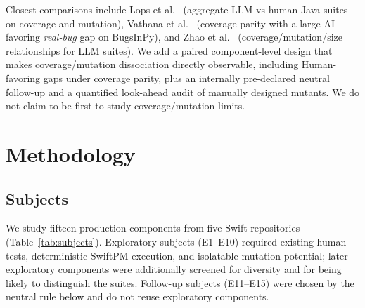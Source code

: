 \documentclass[10pt,conference]{IEEEtran}
\begin{document}
Closest comparisons include Lops et al.~\cite{lops2025agonetest} (aggregate LLM-vs-human Java suites on coverage and mutation), Vathana et al.~\cite{vathana2026} (coverage parity with a large AI-favoring \emph{real-bug} gap on BugsInPy), and Zhao et al.~\cite{zhao2026} (coverage/mutation/size relationships for LLM suites). We add a paired component-level design that makes coverage/mutation dissociation directly observable, including Human-favoring gaps under coverage parity, plus an internally pre-declared neutral follow-up and a quantified look-ahead audit of manually designed mutants. We do not claim to be first to study coverage/mutation limits.

\section{Methodology}

\subsection{Subjects}
We study fifteen production components from five Swift repositories (Table~\ref{tab:subjects}). Exploratory subjects (E1--E10) required existing human tests, deterministic SwiftPM execution, and isolatable mutation potential; later exploratory components were additionally screened for diversity and for being likely to distinguish the suites. Follow-up subjects (E11--E15) were chosen by the neutral rule below and do not reuse exploratory components.
\end{document}
